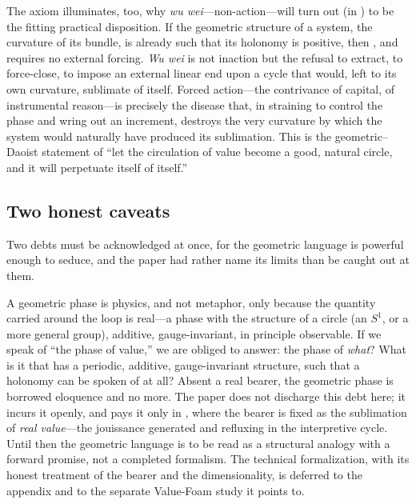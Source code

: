 The axiom illuminates, too, why \emph{wu wei}---non-action---will turn out (in ) to be the fitting practical disposition. If the geometric structure of a system, the curvature of its bundle, is already such that its holonomy is positive, then , and requires no external forcing. \emph{Wu wei} is not inaction but the refusal to extract, to force-close, to impose an external linear end upon a cycle that would, left to its own curvature, sublimate of itself. Forced action---the contrivance of capital, of instrumental reason---is precisely the disease that, in straining to control the phase and wring out an increment, destroys the very curvature by which the system would naturally have produced its sublimation.  This is the geometric--Daoist statement of ``let the circulation of value become a good, natural circle, and it will perpetuate itself of itself.''

\subsection{Two honest caveats}
\label{p09:sec:caveats}

Two debts must be acknowledged at once, for the geometric language is powerful enough to seduce, and the paper had rather name its limits than be caught out at them.

\begin{claim}
A geometric phase is physics, and not metaphor, only because the quantity carried around the loop is real---a phase with the structure of a circle (an $S^1$, or a more general group), additive, gauge-invariant, in principle observable. If we speak of ``the phase of value,'' we are obliged to answer: the phase of \emph{what}? What is it that has a periodic, additive, gauge-invariant structure, such that a holonomy can be spoken of at all? Absent a real bearer, the geometric phase is borrowed eloquence and no more. The paper does not discharge this debt here; it incurs it openly, and pays it only in , where the bearer is fixed as the sublimation of \emph{real value}---the jouissance generated and refluxing in the interpretive cycle. Until then the geometric language is to be read as a structural analogy with a forward promise, not a completed formalism. The technical formalization, with its honest treatment of the bearer and the dimensionality, is deferred to the appendix and to the separate Value-Foam study it points to.
\end{claim}

